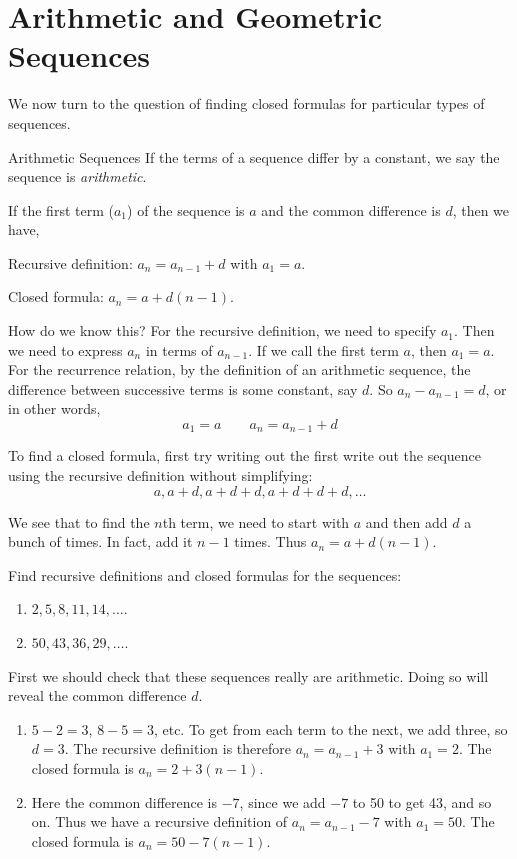 \documentclass[12pt]{article}
\begin{document}
\section{Arithmetic and Geometric Sequences}
We now turn to the question of finding closed formulas for particular types of sequences.


\begin{defbox}{Arithmetic Sequences}
  If the terms of a sequence differ by a constant, we say the sequence is {\em arithmetic}.
  
  If the first term ($a_1$) of the sequence is $a$ and the common difference is $d$, then we have,
  
  Recursive definition: $a_n = a_{n-1} + d$ with $a_1 = a$.
  
  Closed formula: $a_n = a + d(n-1)$.
\end{defbox}

How do we know this? For the recursive definition, we need to specify $a_1$.  Then we need to express $a_n$ in terms of $a_{n-1}$.  If we call the first term $a$, then $a_1 = a$.  For the recurrence relation, by the definition of an arithmetic sequence, the difference between successive terms is some constant, say $d$.  So $a_n - a_{n-1} = d$, or in other words, \[ a_1 = a \qquad a_n=a_{n-1}+d\]

To find a closed formula, first try writing out the first write out the sequence using the recursive definition without simplifying:
\[a, a+d, a+d+d, a+d+d+d, \ldots\]

We see that to find the $n$th term, we need to start with $a$ and then add $d$ a bunch of times. In fact, add it $n-1$ times.  Thus $a_n = a+d(n-1)$.  

\begin{example}
  Find recursive definitions and closed formulas for the sequences:
  \begin{enumerate}
  \item $2, 5, 8, 11, 14, \ldots$.
    \item $50, 43, 36, 29, \ldots$.
    
  \end{enumerate}
  \begin{solution}
  First we should check that these sequences really are arithmetic.  Doing so will reveal the common difference $d$.
    \begin{enumerate}
      \item $5-2 = 3$, $8-5 = 3$, etc.  To get from each term to the next, we add three, so $d = 3$.  The recursive definition is therefore $a_n = a_{n-1} + 3$ with $a_1 = 2$.  The closed formula is $a_n = 2 + 3(n-1)$.
      \item Here the common difference is $-7$, since we add $-7$ to 50 to get 43, and so on.  Thus we have a recursive definition of $a_n = a_{n-1} - 7$ with $a_1 = 50$.  The closed formula is $a_n = 50 - 7(n-1)$.
    \end{enumerate}

  \end{solution}

\end{example}
\end{document}

